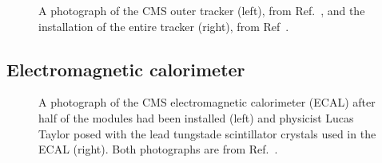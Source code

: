 \begin{figure}[htb]
    \centering
    \quad
    \caption{
        A photograph of the CMS outer tracker (left), from Ref.~\cite{Maximilien:995912}, and the installation of the entire tracker (right), from Ref~\cite{Hoch:1275108}. 
    }
    \label{fig:cms_tracker}
\end{figure}

\subsection{Electromagnetic calorimeter}

\begin{figure}[htb]
    \centering
    \quad
    \caption{
        A photograph of the CMS electromagnetic calorimeter (ECAL) after half of the modules had been installed (left) and physicist Lucas Taylor posed with the lead tungstade scintillator crystals used in the ECAL (right). 
        Both photographs are from Ref.~\cite{Brice:1431477}.
    }
    \label{fig:cms_ecal}
\end{figure}

